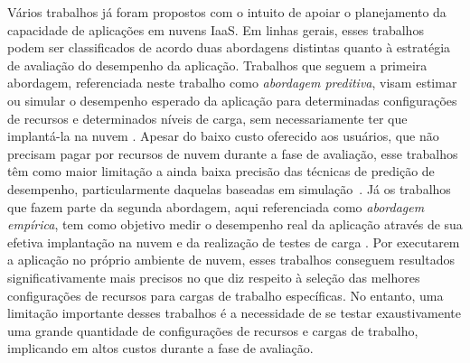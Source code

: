 \documentclass[12pt]{article}
\begin{document}
Vários trabalhos já foram propostos com o intuito de apoiar o planejamento da capacidade de aplicações em nuvens IaaS. Em 
linhas gerais, esses trabalhos podem ser classificados de acordo duas abordagens distintas quanto à estratégia de 
avaliação do desempenho da aplicação. Trabalhos que seguem a primeira abordagem, referenciada neste 
trabalho como \emph{abordagem preditiva}, visam estimar ou simular o desempenho esperado da aplicação para determinadas 
configurações de recursos e determinados níveis de carga, sem necessariamente
ter que implantá-la na nuvem  \cite{cloudharmony, malkowski2010cloudxplor, li2011, li2011cloudprophet, fittkau2012cdosim, jung2013cloudadvisor}. Apesar do baixo custo oferecido aos usuários, que não precisam pagar por recursos de nuvem durante a fase de avaliação, esse trabalhos têm como maior limitação a ainda baixa precisão das técnicas de predição de desempenho, particularmente daquelas baseadas em simulação~\cite{fittkau2012cdosim}. Já os trabalhos que fazem parte da segunda abordagem, aqui referenciada como \emph{abordagem empírica}, tem como objetivo medir o desempenho real da aplicação através de sua efetiva implantação na nuvem e da realização de testes de carga \cite{jayasinghe2012, silva2013cloudbench, cunha2013b, scheuner2014cloud}. Por executarem a aplicação no próprio ambiente de nuvem, esses trabalhos conseguem resultados significativamente mais precisos no que diz respeito à seleção das melhores configurações de recursos para cargas de trabalho específicas. No entanto, uma limitação importante desses trabalhos é a necessidade de se testar exaustivamente uma grande quantidade de configurações de recursos e cargas de trabalho, implicando em altos custos durante a fase de avaliação.

\end{document}
